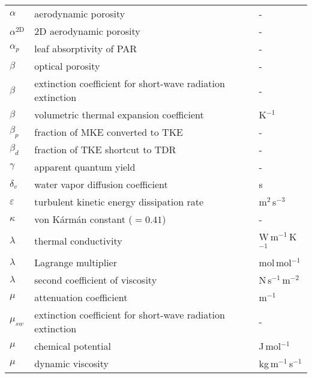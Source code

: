 \begin{longtable}{p{}p{}p{}}

	$\alpha$ & aerodynamic porosity & -\\ 
	$\alpha^{\mathrm{2D}}$ & $2$D aerodynamic porosity & -\\ 	

	$\alpha_p$ &  leaf absorptivity of PAR & -\\ 	

	$\beta$ & optical porosity & -\\ 	
	$\beta$ & extinction coefficient for short-wave radiation extinction & - \\ 		
	$\beta$ & volumetric thermal expansion coefficient & K$^{-1}$\\ 	
	$\beta_p$ & fraction of MKE converted to TKE & -\\ 		
	$\beta_d$ & fraction of TKE shortcut to TDR & -\\ 			

	$\gamma$ & apparent quantum yield & - \\ 
	
	$\delta_v$ & water vapor diffusion coefficient & s \\

	$\varepsilon$ & turbulent kinetic energy dissipation rate & m$^2$\,s$^{-3}$ \\ 


	$\kappa$ & von K\'arm\'an constant ($=0.41$) & - \\

	$\lambda$ & thermal conductivity & W\,m$^{-1}$\,K$^{-1}$ \\
	$\lambda$ & Lagrange multiplier & mol\,mol$^{-1}$ \\	
	$\lambda$ & second coefficient of viscosity & N\,s$^{-1}$\,m$^{-2}$ \\	
	$\mu$ & attenuation coefficient & m$^{-1}$ \\ 
	$\mu_{\textit{sw}}$ & extinction coefficient for short-wave radiation extinction & - \\ 	
	$\mu$ & chemical potential & J\,mol$^{-1}$\\
	$\mu$ & dynamic viscosity & kg\,m$^{-1}$\,s$^{-1}$ \\ 



\end{longtable}
